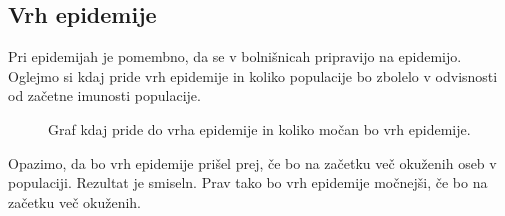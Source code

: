 \documentclass[slovene,11pt,a4paper]{article}
\numberwithin{equation}{section} %
\numberwithin{figure}{section} %
\numberwithin{table}{section} %
\begin{document}
\subsection{Vrh epidemije}
Pri epidemijah je pomembno, da se v bolnišnicah pripravijo na epidemijo. Oglejmo si kdaj pride vrh epidemije in koliko populacije bo zbolelo v odvisnosti od začetne imunosti populacije.

\begin{figure}[h]
\noindent{}
\caption{Graf kdaj pride do vrha epidemije in koliko močan bo vrh epidemije.}
\end{figure}
Opazimo, da bo vrh epidemije prišel prej, če bo na začetku več okuženih oseb v populaciji. Rezultat je smiseln. Prav tako bo vrh epidemije močnejši, če bo na začetku več okuženih.
\end{document}
